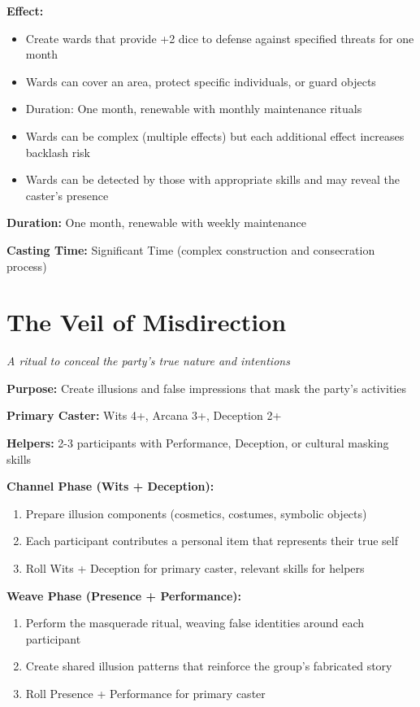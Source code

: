 \textbf{Effect:}
\begin{itemize}
\item Create wards that provide +2 dice to defense against specified threats for one month
\item Wards can cover an area, protect specific individuals, or guard objects
\item Duration: One month, renewable with monthly maintenance rituals
\item Wards can be complex (multiple effects) but each additional effect increases backlash risk
\item Wards can be detected by those with appropriate skills and may reveal the caster's presence
\end{itemize}

\textbf{Duration:} One month, renewable with weekly maintenance

\textbf{Casting Time:} Significant Time (complex construction and consecration process)

\section*{The Veil of Misdirection}
\textit{A ritual to conceal the party's true nature and intentions}

\textbf{Purpose:} Create illusions and false impressions that mask the party's activities

\textbf{Primary Caster:} Wits 4+, Arcana 3+, Deception 2+

\textbf{Helpers:} 2-3 participants with Performance, Deception, or cultural masking skills

\textbf{Channel Phase (Wits + Deception):}
\begin{enumerate}
\item Prepare illusion components (cosmetics, costumes, symbolic objects)
\item Each participant contributes a personal item that represents their true self
\item Roll Wits + Deception for primary caster, relevant skills for helpers
\end{enumerate}

\textbf{Weave Phase (Presence + Performance):}
\begin{enumerate}
\item Perform the masquerade ritual, weaving false identities around each participant
\item Create shared illusion patterns that reinforce the group's fabricated story
\item Roll Presence + Performance for primary caster
\end{enumerate}

